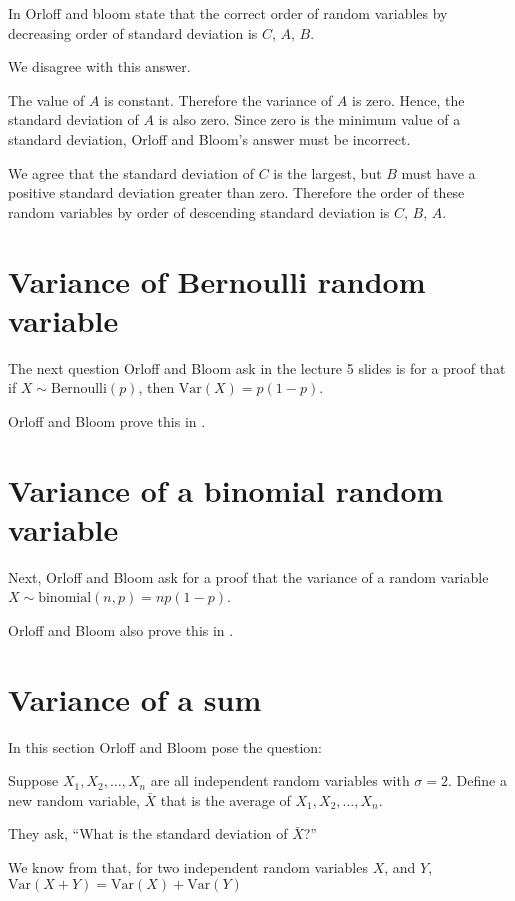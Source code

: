 \documentclass[a4paper,11pt]{article}
\begin{document}
In \cite{slides5Ans} Orloff and bloom state that the correct order of random
variables by decreasing order of standard deviation is $C$, $A$, $B$.

We disagree with this answer.

The value of $A$ is constant.  Therefore the variance of $A$ is zero.  Hence,
the standard deviation of $A$ is also zero.  Since zero is the minimum value
of a standard deviation, Orloff and Bloom's answer must be incorrect.

We agree that the standard deviation of $C$ is the largest, but $B$ must have
a positive standard deviation greater than zero.  Therefore the order of these
random variables by order of descending standard deviation is $C$, $B$, $A$.


\section{Variance of Bernoulli random variable}

The next question Orloff and Bloom ask in the lecture 5 slides is for a proof
that if $X \sim \text{Bernoulli} \left( p \right)$, then
$\text{Var}\left( X \right) = p\left( 1-p \right)$.

Orloff and Bloom prove this in \cite{reading5a}.

\section{Variance of a binomial random variable}

Next, Orloff and Bloom ask for a proof that the variance of a random variable
$X \sim \text{binomial}\left(n, p \right) = np \left( 1 - p \right)$.

Orloff and Bloom also prove this in \cite{reading5a}.

\section{Variance of a sum}

In this section Orloff and Bloom pose the question:

Suppose $X_{1}, X_{2}, \ldots, X_{n}$ are all independent random variables
with $\sigma = 2$.  Define a new random variable, $\bar{X}$ that is the average
of $X_{1}, X_{2}, \ldots, X_{n}$.

They ask, ``What is the standard deviation of $\bar{X}$?''

We know from \cite{reading5a} that, for two independent random variables $X$,
and $Y$, $\text{Var}\left( X + Y \right) = \text{Var}\left( X \right) +
\text{Var}\left( Y \right)$
\end{document}
